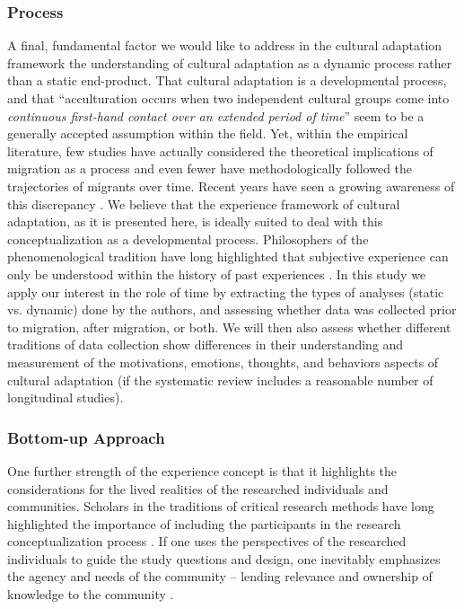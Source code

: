 \documentclass[man, 12pt, a4paper]{apa7}
\begin{document}
\subsubsection{Process} 
A final, fundamental factor we would like to address in the cultural adaptation framework the understanding of cultural adaptation as a dynamic process rather than a static end-product. That cultural adaptation is a developmental process, and that ``acculturation occurs when two independent cultural groups come into \textit{continuous first-hand contact over an extended period of time}'' \citep[][186]{Berry1989} seem to be a generally accepted assumption within the field. Yet, within the empirical literature, few studies have actually considered the theoretical implications of migration as a process and even fewer have methodologically followed the trajectories of migrants over time. Recent years have seen a growing awareness of this discrepancy \citep[e.g.,][]{Brown2011, Ward2019}. We believe that the experience framework of cultural adaptation, as it is presented here, is ideally suited to deal with this conceptualization as a developmental process. Philosophers of the phenomenological tradition have long highlighted that subjective experience can only be understood within the history of past experiences \citep[e.g.,][; also see Figure \ref{fig:ModelContext}]{Heidegger1867}. In this study we apply our interest in the role of time by extracting the types of analyses (static vs. dynamic) done by the authors, and assessing whether data was collected prior to migration, after migration, or both. We will then also assess whether different traditions of data collection show differences in their understanding and measurement of the motivations, emotions, thoughts, and behaviors aspects of cultural adaptation (if the systematic review includes a reasonable number of longitudinal studies).

\subsubsection{Bottom-up Approach} 
One further strength of the experience concept is that it highlights the considerations for the lived realities of the researched individuals and communities. Scholars in the traditions of critical research methods have long highlighted the importance of including the participants in the research conceptualization process \citep[e.g.,][]{Kovach2009}. If one uses the perspectives of the researched individuals to guide the study questions and design, one inevitably emphasizes the agency and needs of the community -- lending relevance and ownership of knowledge to the community \citep[e.g., ][]{Schmidt2021}.
\end{document}
